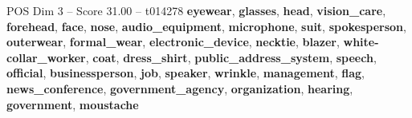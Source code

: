 \begin{textsample}{POS Dim 3 – Score 31.00 – t014278}  \label{ex:f3_pos_022}
\textbf{eyewear}, \textbf{glasses}, \textbf{head}, \textbf{vision\_care}, \textbf{forehead}, \textbf{face}, \textbf{nose}, \textbf{audio\_equipment}, \textbf{microphone}, \textbf{suit}, \textbf{spokesperson}, \textbf{outerwear}, \textbf{formal\_wear}, \textbf{electronic\_device}, \textbf{necktie}, \textbf{blazer}, \textbf{white-collar\_worker}, \textbf{coat}, \textbf{dress\_shirt}, \textbf{public\_address\_system}, \textbf{speech}, \textbf{official}, \textbf{businessperson}, \textbf{job}, \textbf{speaker}, \textbf{wrinkle}, \textbf{management}, \textbf{flag}, \textbf{news\_conference}, \textbf{government\_agency}, \textbf{organization}, \textbf{hearing}, \textbf{government}, \textbf{moustache}

\end{textsample}
